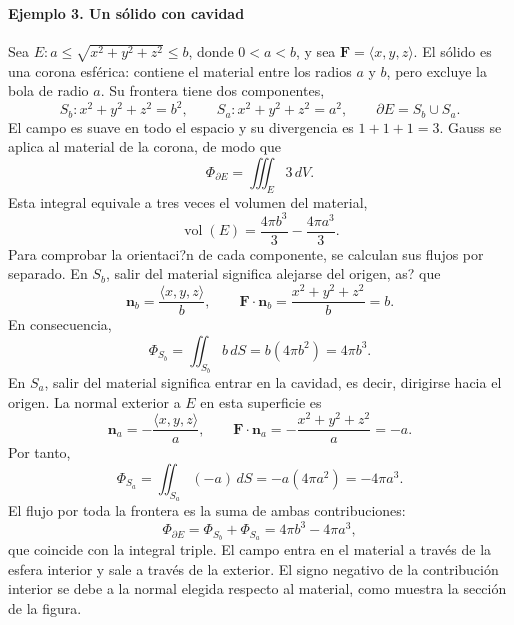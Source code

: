 \paragraph{Ejemplo 3. Un sólido con cavidad}
Sea $E:a\leq\sqrt{x^2+y^2+z^2}\leq b$, donde $0<a<b$, y sea $\mathbf F=\langle x,y,z\rangle$. El sólido es una corona esférica: contiene el material entre los radios $a$ y $b$, pero excluye la bola de radio $a$. Su frontera tiene dos componentes,
\[
S_b:x^2+y^2+z^2=b^2,\qquad
S_a:x^2+y^2+z^2=a^2,\qquad
\partial E=S_b\cup S_a.
\]
El campo es suave en todo el espacio y su divergencia es $1+1+1=3$. Gauss se aplica al material de la corona, de modo que
\[
\Phi_{\partial E}=\iiint_E3\,dV.
\]
Esta integral equivale a tres veces el volumen del material,
\[
\operatorname{vol}(E)=\frac{4\pi b^3}{3}-\frac{4\pi a^3}{3}.
\]
Para comprobar la orientaci?n de cada componente, se calculan sus flujos por separado. En $S_b$, salir del material significa alejarse del origen, as? que
\[
\mathbf n_b=\frac{\langle x,y,z\rangle}{b},
\qquad \mathbf F\cdot\mathbf n_b
=\frac{x^2+y^2+z^2}{b}=b.
\]
En consecuencia,
\[
\Phi_{S_b}=\iint_{S_b}b\,dS=b(4\pi b^2)=4\pi b^3.
\]
En $S_a$, salir del material significa entrar en la cavidad, es decir, dirigirse hacia el origen. La normal exterior a $E$ en esta superficie es
\[
\mathbf n_a=-\frac{\langle x,y,z\rangle}{a},
\qquad \mathbf F\cdot\mathbf n_a
=-\frac{x^2+y^2+z^2}{a}=-a.
\]
Por tanto,
\[
\Phi_{S_a}=\iint_{S_a}(-a)\,dS=-a(4\pi a^2)=-4\pi a^3.
\]
El flujo por toda la frontera es la suma de ambas contribuciones:
\[
\Phi_{\partial E}=\Phi_{S_b}+\Phi_{S_a}
=4\pi b^3-4\pi a^3,
\]
que coincide con la integral triple. El campo entra en el material a través de la esfera interior y sale a través de la exterior. El signo negativo de la contribución interior se debe a la normal elegida respecto al material, como muestra la sección de la figura.

\begingroup\shorthandoff{>}
\begin{center}
\end{center}
\endgroup

